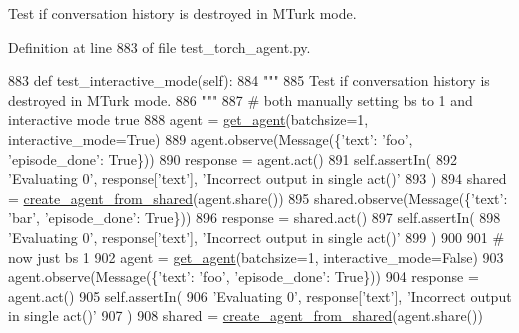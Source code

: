 \begin{DoxyVerb}Test if conversation history is destroyed in MTurk mode.
\end{DoxyVerb}
 

Definition at line 883 of file test\+\_\+torch\+\_\+agent.\+py.


\begin{DoxyCode}
883     \textcolor{keyword}{def }test\_interactive\_mode(self):
884         \textcolor{stringliteral}{"""}
885 \textcolor{stringliteral}{        Test if conversation history is destroyed in MTurk mode.}
886 \textcolor{stringliteral}{        """}
887         \textcolor{comment}{# both manually setting bs to 1 and interactive mode true}
888         agent = \hyperlink{namespacetests_1_1test__torch__agent_ae929d109305aaea29fbfa13ecf1f32e9}{get\_agent}(batchsize=1, interactive\_mode=\textcolor{keyword}{True})
889         agent.observe(Message(\{\textcolor{stringliteral}{'text'}: \textcolor{stringliteral}{'foo'}, \textcolor{stringliteral}{'episode\_done'}: \textcolor{keyword}{True}\}))
890         response = agent.act()
891         self.assertIn(
892             \textcolor{stringliteral}{'Evaluating 0'}, response[\textcolor{stringliteral}{'text'}], \textcolor{stringliteral}{'Incorrect output in single act()'}
893         )
894         shared = \hyperlink{namespaceparlai_1_1core_1_1agents_aa5af5dd1d2f9da491b60348d479b849f}{create\_agent\_from\_shared}(agent.share())
895         shared.observe(Message(\{\textcolor{stringliteral}{'text'}: \textcolor{stringliteral}{'bar'}, \textcolor{stringliteral}{'episode\_done'}: \textcolor{keyword}{True}\}))
896         response = shared.act()
897         self.assertIn(
898             \textcolor{stringliteral}{'Evaluating 0'}, response[\textcolor{stringliteral}{'text'}], \textcolor{stringliteral}{'Incorrect output in single act()'}
899         )
900 
901         \textcolor{comment}{# now just bs 1}
902         agent = \hyperlink{namespacetests_1_1test__torch__agent_ae929d109305aaea29fbfa13ecf1f32e9}{get\_agent}(batchsize=1, interactive\_mode=\textcolor{keyword}{False})
903         agent.observe(Message(\{\textcolor{stringliteral}{'text'}: \textcolor{stringliteral}{'foo'}, \textcolor{stringliteral}{'episode\_done'}: \textcolor{keyword}{True}\}))
904         response = agent.act()
905         self.assertIn(
906             \textcolor{stringliteral}{'Evaluating 0'}, response[\textcolor{stringliteral}{'text'}], \textcolor{stringliteral}{'Incorrect output in single act()'}
907         )
908         shared = \hyperlink{namespaceparlai_1_1core_1_1agents_aa5af5dd1d2f9da491b60348d479b849f}{create\_agent\_from\_shared}(agent.share())

\end{DoxyCode}
